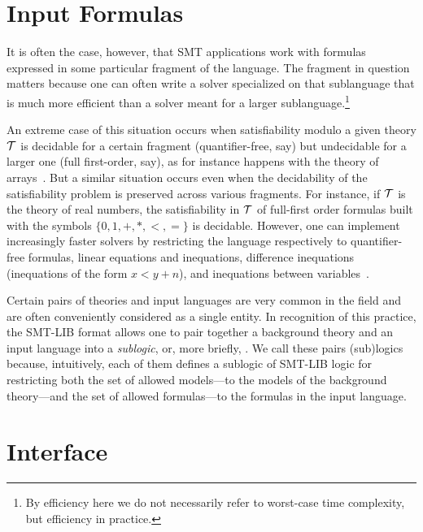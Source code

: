 \section{Input Formulas}

It is often the case, however, that 
SMT applications work with formulas expressed in some particular fragment 
of the language.
The fragment in question matters
because one can often write a solver specialized on that sublanguage 
that is much more efficient than a solver meant for a larger sublanguage.\footnote{
By efficiency here we do not necessarily refer to worst-case time complexity,
but efficiency in practice.
}

An extreme case of this situation occurs
when satisfiability modulo a given theory $\mathcal{T}$
is decidable for a certain fragment (quantifier-free, say)
but undecidable for a larger one (full first-order, say),
as for instance happens with the theory of arrays~\cite{BraMS-VMCAI-06}.
But a similar situation occurs even
when the decidability of the satisfiability problem is preserved 
across various fragments.
For instance, 
if $\mathcal{T}$ is the theory of real numbers,
the satisfiability in $\mathcal{T}$ of full-first order formulas
built with the symbols $\{0,1,+,*,<,=\}$ is decidable.
However, one can implement increasingly faster solvers by restricting
the language respectively to quantifier-free formulas, 
linear equations and inequations,
difference inequations (inequations of the form $x < y + n$),
and
inequations between variables~\cite{Bozzanoetal2005TACAS}.

Certain pairs of theories and input languages are very common in the field
and are often conveniently considered as a single entity.
In recognition of this practice,
the SMT-LIB format allows one to pair together 
a background theory and an input language into a \emph{sublogic}, 
or, more briefly, .
We call these pairs (sub)logics because,
intuitively, 
each of them defines a sublogic of SMT-LIB logic
for restricting 
both the set of allowed models---to the models of the background theory---and 
the set of allowed formulas---to the formulas in the input language.


\section{Interface}

